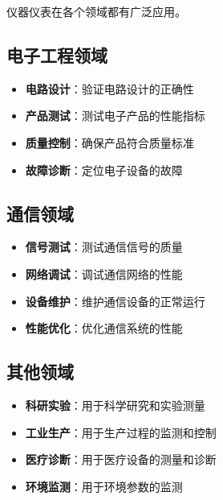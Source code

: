 仪器仪表在各个领域都有广泛应用。

\subsection{电子工程领域}
\begin{itemize}
    \item \textbf{电路设计}：验证电路设计的正确性
    \item \textbf{产品测试}：测试电子产品的性能指标
    \item \textbf{质量控制}：确保产品符合质量标准
    \item \textbf{故障诊断}：定位电子设备的故障
\end{itemize}

\subsection{通信领域}
\begin{itemize}
    \item \textbf{信号测试}：测试通信信号的质量
    \item \textbf{网络调试}：调试通信网络的性能
    \item \textbf{设备维护}：维护通信设备的正常运行
    \item \textbf{性能优化}：优化通信系统的性能
\end{itemize}

\subsection{其他领域}
\begin{itemize}
    \item \textbf{科研实验}：用于科学研究和实验测量
    \item \textbf{工业生产}：用于生产过程的监测和控制
    \item \textbf{医疗诊断}：用于医疗设备的测量和诊断
    \item \textbf{环境监测}：用于环境参数的监测
\end{itemize}
